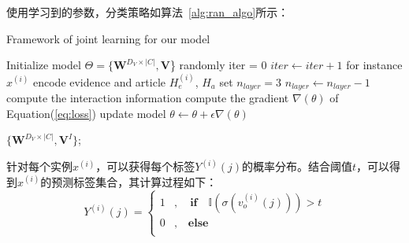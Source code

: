使用学习到的参数，分类策略如算法~\ref{alg:ran_algo}所示：
\begin{algorithm}[htbp]
    \caption{Framework of joint learning for our model}
    \label{alg:ran_algo}
    \begin{algorithmic}[1]
    \State Initialize model $\Theta=\{\textbf{W}^{D_V\times |C|},\textbf{V}$\} randomly
    \label{code:fram:initialize parameters}
    \State iter = 0
    \label{code:fram:begin}
    \Repeat
    \label{code:fram:repeat}
        \State $iter \leftarrow iter+1$
        \label{code:fram:re_value}
        \label{code:fram:for1}
            \State for instance $x^{(i)}$
            \label{code:fram:task_join1}
            \State encode evidence and article $H_e^{(i)}$, $H_a$
            \label{code:fram:encode}
            \State set $n_{layer} = 3$
            \label{code:fram:recurrent_layer}
            \Repeat
            \label{code:fram:repeat_recurrent}
                \State $n_{layer} \leftarrow n_{layer} - 1$ 
                \label{code:fram:iter_layer}
                \State compute the interaction information
                \label{code:fram:compute_iteraction}
            \State compute the gradient $\nabla(\theta)$ of Equation(\ref{eq:loss})
            \label{code:fram:com_grad}
            \State update model $\theta \leftarrow \theta + \epsilon \nabla(\theta)$
            \label{code:fram:update_grad}
        \EndFor
        
    \State
    \Return $\{\textbf{W}^{D_V\times |C|},\textbf{V}^I\}$;
    \end{algorithmic}
\end{algorithm}

针对每个实例$x^{(i)}$，可以获得每个标签$Y^{(i)}(j)$的概率分布。结合阈值$t$，可以得到$x^{(i)}$的预测标签集合，其计算过程如下：
\begin{displaymath}
    Y^{(i)}(j)=\left\{
    \begin{aligned}
    1 &, \quad \textbf{if} \quad \mathbb{I}(\sigma(v_{o}^{(i)}(j))) > t \\
    0 &, \quad \textbf{else} \\
    \end{aligned}
    \right.
\end{displaymath}

